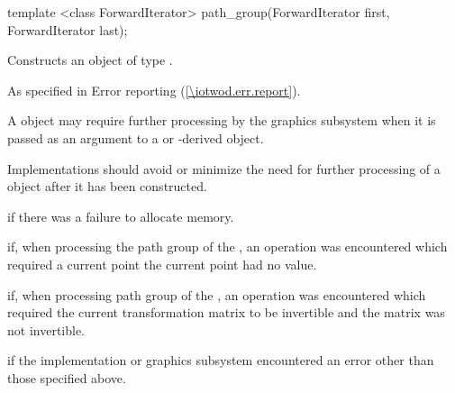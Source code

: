 \begin{itemdecl}
    template <class ForwardIterator>
    path_group(ForwardIterator first, ForwardIterator last);
\end{itemdecl}
\begin{itemdescr}
	\pnum
	\effects
	Constructs an object of type .

	\pnum
	\throws
	As specified in Error reporting (\ref{\iotwod.err.report}).

	\pnum
	\remarks
	A  object may require further processing by the graphics subsystem when it is passed as an argument to a  or -derived object.
	
	\pnum
	Implementations should avoid or minimize the need for further processing of a  object after it has been constructed.

	\pnum
	\errors
	 if there was a failure to allocate memory.
	
	\pnum
	 if, when processing the path group of the , an operation was encountered which required a current point the current point had no value.
	
	\pnum
	 if, when processing path group of the , an operation was encountered which required the current transformation matrix to be invertible and the matrix was not invertible.
	
	\pnum
	 if the implementation or graphics subsystem encountered an error other than those specified above.
\end{itemdescr}
